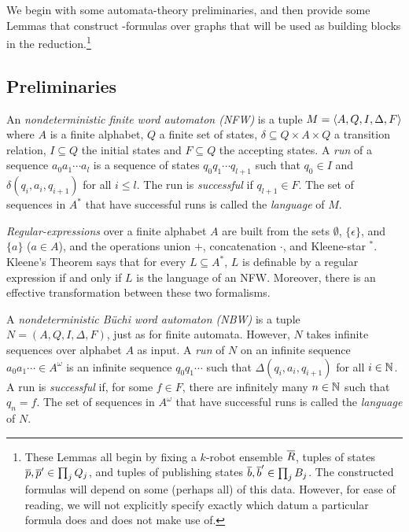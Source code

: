 We begin with some automata-theory preliminaries, and then provide some Lemmas that construct \msol-formulas over graphs that will be used as building blocks in the reduction.\footnote{These Lemmas all begin by fixing a $k$-robot ensemble $\overline{R}$, tuples of states $\overline{p},\overline{p}' \in \prod_j Q_j$, and tuples of publishing states 
$\overline{b},\overline{b}' \in \prod_j B_j$. The constructed formulas will depend on some (perhaps all) of this data. However, for ease of reading, we will not explicitly specify
exactly which datum a particular formula does and does not make use of.}


\subsection{Preliminaries}


An {\em nondeterministic finite word automaton (NFW)} is a tuple $M = \langle {A,Q,I,\Delta,F} \rangle$ where $A$ is a finite alphabet, $Q$ a finite set of states, $\delta \subseteq Q \times A \times Q$ a transition relation, $I \subseteq Q$ the initial states and $F \subseteq Q$ the accepting states. A \emph{run} of a sequence $a_0 a_1 \cdots a_l$ is a sequence of states $q_0 q_1 \cdots q_{l+1}$ such that $q_0 \in I$ and $\delta(q_i,a_i,q_{i+1})$ for all $i \leq l$. The run is \emph{successful} if $q_{l+1} \in F$. The set of sequences in $A^*$ that have successful runs is called the \emph{language} of $M$.

{\em Regular-expressions} over a finite alphabet $A$ are built from the 
sets $\emptyset$, $\{\epsilon\}$, and $\{a\}$ ($a \in A$), and the operations 
union $+$, concatenation $\cdot$, and Kleene-star $\phantom{}^*$.
Kleene's Theorem says that for every $L \subseteq A^*$, $L$ is definable by a regular expression if and only if $L$ is the language of an NFW.
Moreover, there is an effective transformation between these two formalisms.

A \emph{nondeterministic B\"uchi word automaton (NBW)} is a tuple $N = (A,Q,I,\Delta,F)$, just as for finite automata. However, $N$ takes infinite sequences over alphabet $A$ as input. A \emph{run} of $N$ on an infinite sequence $a_0 a_1 \cdots \in A^\omega$ is an infinite sequence $q_0 q_1 \cdots$ such that $\Delta(q_i,a_i,q_{i+1})$ for all $i \in \mathbb{N}$. A run is \emph{successful} if, for some $f \in F$, there are infinitely many $n \in \mathbb{N}$ such that $q_n = f$. The set of  sequences in $A^\omega$ that have successful runs is called 
the \emph{language} of $N$.



